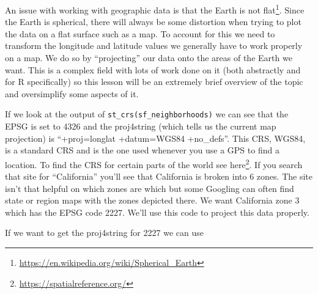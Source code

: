 \documentclass[
]{krantz}
\renewcommand{\href}[2]{#2\footnote{\url{#1}}}
\begin{document}
An issue with working with geographic data is that \href{https://en.wikipedia.org/wiki/Spherical_Earth}{the Earth is not flat}. Since the Earth is spherical, there will always be some distortion when trying to plot the data on a flat surface such as a map. To account for this we need to transform the longitude and latitude values we generally have to work properly on a map. We do so by ``projecting'' our data onto the areas of the Earth we want. This is a complex field with lots of work done on it (both abstractly and for R specifically) so this lesson will be an extremely brief overview of the topic and oversimplify some aspects of it.

If we look at the output of \texttt{st\_crs(sf\_neighborhoods)} we can see that the EPSG is set to 4326 and the proj4string (which tells us the current map projection) is ``+proj=longlat +datum=WGS84 +no\_defs''. This CRS, WGS84, is a standard CRS and is the one used whenever you use a GPS to find a location. To find the CRS for certain parts of the world see \href{https://spatialreference.org/}{here}. If you search that site for ``California'' you'll see that California is broken into 6 zones. The site isn't that helpful on which zones are which but some Googling can often find state or region maps with the zones depicted there. We want California zone 3 which has the EPSG code 2227. We'll use this code to project this data properly.

If we want to get the proj4string for 2227 we can use
\end{document}
